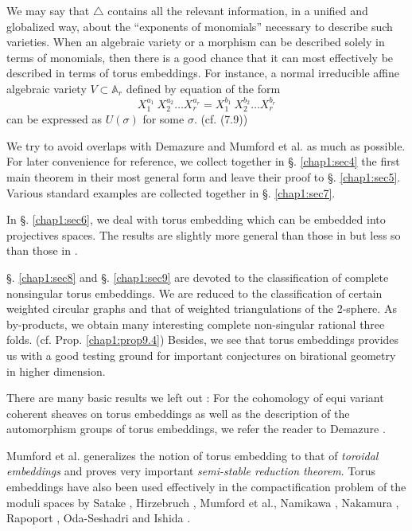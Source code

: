 We may say that $\triangle$ contains all the relevant information, in
a unified and globalized way, about the ``exponents of monomials''
necessary to describe such varieties. When an algebraic variety or a
morphism can be described solely in terms of monomials, then there is
a good chance that it can most effectively be described in terms of
torus embeddings. For instance, a normal irreducible affine algebraic
variety $V \subset \mathbb{A}_r$ defined by equation of the form  
$$
X^{a_1}_1 ~X^{a_2}_2 \ldots X^{a_r}_r  = X^{b_1}_1~X^{b_2}_2 \ldots
X^{b_r}_r 
$$
can be expressed as $U(\sigma)$ for some $\sigma$. (cf. (7.9))

We try to avoid overlaps with Demazure \cite{keyD2} and Mumford et
al. \cite{keyTE} as much as possible. For later convenience for reference,
we collect together in \S. \ref{chap1:sec4} the first main theorem in their most
general form and leave their proof to \S. \ref{chap1:sec5}. Various standard
examples are collected together in \S. \ref{chap1:sec7}. 

In \S. \ref{chap1:sec6}, we deal with torus embedding which can be embedded into
projectives spaces. The results are slightly more general than those
in \cite{keyD2} but less so than those in \cite{keyTE}. 

\S. \ref{chap1:sec8} and \S. \ref{chap1:sec9} are devoted to the
classification of complete 
nonsingular torus embeddings. We are reduced to the classification of
certain weighted circular graphs and that of weighted triangulations
of the 2-sphere. As by-products, we obtain many interesting complete
non-singular rational three folds. (cf. Prop. \ref{chap1:prop9.4}) Besides, we see
that torus embeddings provides us with a good testing ground for
important conjectures on birational geometry in higher dimension. 

There are many basic results we left out : For the cohomology of
equi variant coherent sheaves on torus embeddings as well as the
description of the automorphism groups of torus embeddings, we refer
the reader to Demazure \cite{keyD2}. 

Mumford et al. \cite{keyTE} generalizes the notion of torus embedding to
that of \textit{toroidal embeddings} and proves very important
\textit{semi-stable reduction theorem}. Torus embeddings have also
been used effectively in the compactification problem of the moduli
spaces by Satake \cite{keyS1}, Hirzebruch \cite{keyH4}, Mumford et
al.\cite{keySC}, Namikawa \cite{keyN5}, Nakamura \cite{keyN3},
Rapoport \cite{keyR1}, Oda-Seshadri \cite{keyOS} and Ishida
\cite{keyI5}.  

